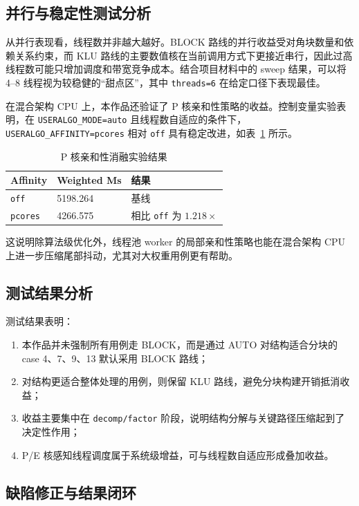 \documentclass[12pt,a4paper,fontset=none]{ctexart}
\begin{document}
\subsection{并行与稳定性测试分析}

从并行表现看，线程数并非越大越好。BLOCK 路线的并行收益受对角块数量和依赖关系约束，而 KLU 路线的主要数值核在当前调用方式下更接近串行，因此过高线程数可能只增加调度和带宽竞争成本。结合项目材料中的 sweep 结果，可以将 4--8 线程视为较稳健的“甜点区”，其中 \texttt{threads=6} 在给定口径下表现最佳。

在混合架构 CPU 上，本作品还验证了 P 核亲和性策略的收益。控制变量实验表明，在 \texttt{USERALGO\_MODE=auto} 且线程数自适应的条件下，\texttt{USERALGO\_AFFINITY=pcores} 相对 \texttt{off} 具有稳定改进，如表~\ref{tab:affinity} 所示。

\begin{table}[H]
\centering
\caption{P 核亲和性消融实验结果}
\label{tab:affinity}
\begin{tabular}{p{2.8cm}p{3cm}p{4.8cm}}
\toprule
Affinity & Weighted Ms & 结果 \\
\midrule
\texttt{off} & 5198.264 & 基线 \\
\texttt{pcores} & 4266.575 & 相比 \texttt{off} 为 $1.218\times$ \\
\bottomrule
\end{tabular}
\end{table}

这说明除算法级优化外，线程池 worker 的局部亲和性策略也能在混合架构 CPU 上进一步压缩尾部抖动，尤其对大权重用例更有帮助。

\subsection{测试结果分析}

测试结果表明：
\begin{enumerate}
  \item 本作品并未强制所有用例走 BLOCK，而是通过 AUTO 对结构适合分块的 case 4、7、9、13 默认采用 BLOCK 路线；
  \item 对结构更适合整体处理的用例，则保留 KLU 路线，避免分块构建开销抵消收益；
  \item 收益主要集中在 \texttt{decomp/factor} 阶段，说明结构分解与关键路径压缩起到了决定性作用；
  \item P/E 核感知线程调度属于系统级增益，可与线程数自适应形成叠加收益。
\end{enumerate}

\subsection{缺陷修正与结果闭环}
\end{document}
